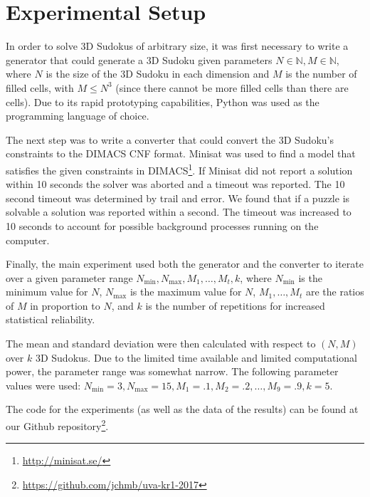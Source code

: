 \section{Experimental Setup}

In order to solve 3D Sudokus of arbitrary size, it was first necessary to write a generator that could generate a 3D Sudoku given parameters $N \in \mathbb{N}, M \in \mathbb{N}$, where $N$ is the size of the 3D Sudoku in each dimension and $M$ is the number of filled cells, with $M \leq N^3$ (since there cannot be more filled cells than there are cells). Due to its rapid prototyping capabilities, Python was used as the programming language of choice.


The next step was to write a converter that could convert the 3D Sudoku's constraints to the DIMACS CNF format. Minisat was used to find a model that satisfies the given constraints in DIMACS\footnote{\url{http://minisat.se/}}. If Minisat did not report a solution within 10 seconds the solver was aborted and a timeout was reported. The 10 second timeout was determined by trail and error. We found that if a puzzle is solvable a solution was reported within a second. The timeout was increased to 10 seconds to account for possible background processes running on the computer.

Finally, the main experiment used both the generator and the converter to iterate over a given parameter range $N_{\min}, N_{\max}, M_1, \hdots, M_t, k$, where $N_{\min}$ is the minimum value for $N$, $N_{\max}$ is the maximum value for $N$, $M_1, \hdots, M_t$ are the ratios of $M$ in proportion to $N$, and $k$ is the number of repetitions for increased statistical reliability. 

The mean and standard deviation were then calculated with respect to $(N, M)$ over $k$ 3D Sudokus. Due to the limited time available and limited computational power, the parameter range was somewhat narrow. The following parameter values were used: $N_{\min} = 3, N_{\max} = 15, M_1 = .1, M_2 = .2, \hdots, M_9 = .9, k = 5$.

The code for the experiments (as well as the data of the results) can be found at our Github repository\footnote{\url{https://github.com/jchmb/uva-kr1-2017}}. 


